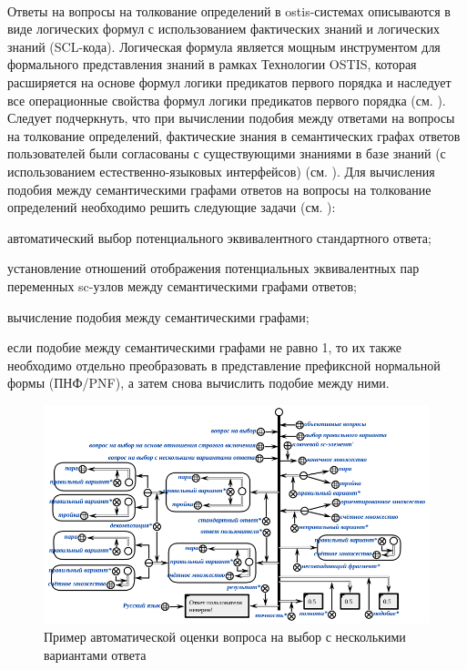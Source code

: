~\\
Ответы на вопросы на толкование определений в ostis-системах описываются в виде логических формул с использованием фактических знаний и логических знаний (SCL-кода). Логическая формула является мощным инструментом для формального представления знаний в рамках Технологии OSTIS, которая расширяется на основе формул логики предикатов первого порядка и наследует все операционные свойства формул логики предикатов первого порядка (см. ). Следует подчеркнуть, что при вычислении подобия между ответами на вопросы на толкование определений, фактические знания в семантических графах ответов пользователей были согласованы с существующими знаниями в базе знаний (с использованием естественно-языковых интерфейсов) (см. ). Для вычисления подобия между семантическими графами ответов на вопросы на толкование определений необходимо решить следующие задачи (см. ):

\begin{textitemize}
	\item автоматический выбор потенциального эквивалентного стандартного ответа;
	\item установление отношений отображения потенциальных эквивалентных пар переменных sc-узлов между семантическими графами ответов;
	\item вычисление подобия между семантическими графами;
	\item если подобие между семантическими графами не равно 1, то их также необходимо отдельно преобразовать в представление префиксной нормальной формы (ПНФ/PNF), а затем снова вычислить подобие между ними.
\end{textitemize}

\begin{figure}[H]
	\includegraphics[scale=0.7]{author/part7/figures/answer_verification_example.png}
	\caption{Пример автоматической оценки вопроса на выбор с несколькими вариантами ответа}
	\label{fig:AV_example}
\end{figure}

